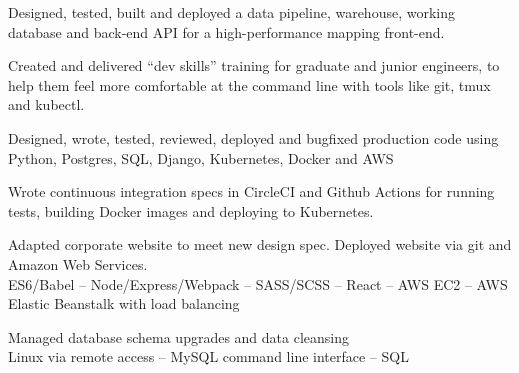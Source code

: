 \documentclass[a4paper,nomath]{deedy-resume} %
\begin{document}
\begin{paracol}{2}
    \vspace{\topsep} %
    \begin{tightitemize}
      \item Designed, tested, built and deployed a data pipeline, warehouse,
        working database and back-end API for a high-performance mapping
        front-end.
       \\ 
      \item Created and delivered ``dev skills'' training for graduate and
        junior engineers, to help them feel more comfortable at the command
        line with tools like git, tmux and kubectl.
    \end{tightitemize}
    \sectionspace %

    
    \vspace{\topsep} %
    \begin{tightitemize}
      \item Designed, wrote, tested, reviewed, deployed and bugfixed production code using Python, Postgres, SQL, Django, Kubernetes, Docker and AWS
       \\ 
     \item Wrote continuous integration specs in CircleCI and Github Actions for running tests, building Docker images and deploying to Kubernetes.

    \end{tightitemize}
    
    \sectionspace %
    
    
    \vspace{\topsep} %
    \begin{tightitemize}
        \item Adapted corporate website to meet new design spec. Deployed website via git and Amazon Web Services.
        \\
        ES6/Babel -- Node/Express/Webpack -- SASS/SCSS -- React -- AWS EC2 -- AWS Elastic Beanstalk with load balancing
        \\
        \item Managed database schema upgrades and data cleansing\\
        Linux via remote access -- MySQL command line interface -- SQL
        

\end{tightitemize}
\end{paracol}
\end{document}
